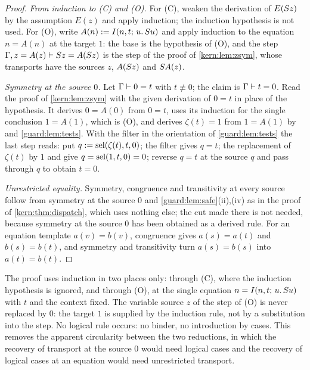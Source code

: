 \begin{proof}
\emph{From induction to \textup{(C)} and \textup{(O)}.}  For (C), weaken the
derivation of $E(S z)$ by the assumption $E(z)$ and apply induction; the
induction hypothesis is not used.  For (O), write
$A(n)\mathrel{:=}I(n,t;\,u.\,S u)$ and apply induction to the equation
$n=A(n)$ at the target $1$: the base is the hypothesis of (O), and the step
$\Gamma,z=A(z)\vdash S z=A(S z)$ is the step of the proof of
\cref{kern:lem:zsym}, whose transports have the sources $z$, $A(S z)$
and $S A(z)$.

\emph{Symmetry at the source $0$.}  Let $\Gamma\vdash 0=t$ with
$t\not\equiv 0$; the claim is $\Gamma\vdash t=0$.  Read the proof of
\cref{kern:lem:zsym} with the given derivation of $0=t$ in place of the
hypothesis.  It derives $0=A(0)$ from $0=t$, uses its induction for the
single conclusion $1=A(1)$, which is (O), and derives $\zeta(t)=1$ from
$1=A(1)$ by  and \cref{guard:lem:tests}.  With the filter in
the orientation of \cref{guard:lem:tests} the last step reads: put
$q\mathrel{:=}\operatorname{sel}(\zeta(t),t,0)$; the filter gives $q=t$; the replacement of
$\zeta(t)$ by $1$ and  give $q=\operatorname{sel}(1,t,0)=0$; reverse $q=t$
at the source $q$ and pass through $q$ to obtain $t=0$.

\emph{Unrestricted equality.}  Symmetry, congruence and transitivity at
every source follow from symmetry at the source $0$ and
\cref{guard:lem:safe}(ii),(iv) as in the proof of \cref{kern:thm:dispatch},
which uses nothing else; the cut made there is not needed, because symmetry
at the source $0$ has been obtained as a derived rule.  For an equation
template $a(v)=b(v)$, congruence gives $a(s)=a(t)$ and $b(s)=b(t)$, and
symmetry and transitivity turn $a(s)=b(s)$ into $a(t)=b(t)$.
\end{proof}

The proof uses induction in two places only: through (C), where the
induction hypothesis is ignored, and through (O), at the single equation
$n=I(n,t;\,u.\,S u)$ with $t$ and the context fixed.  The variable
source $z$ of the step of (O) is never replaced by $0$: the target $1$ is
supplied by the induction rule, not by a substitution into the step.  No
logical rule occurs: no binder, no introduction by cases.  This removes the
apparent circularity between the two reductions, in which the recovery of
transport at the source $0$ would need logical cases and the recovery of
logical cases at an equation would need unrestricted transport.

